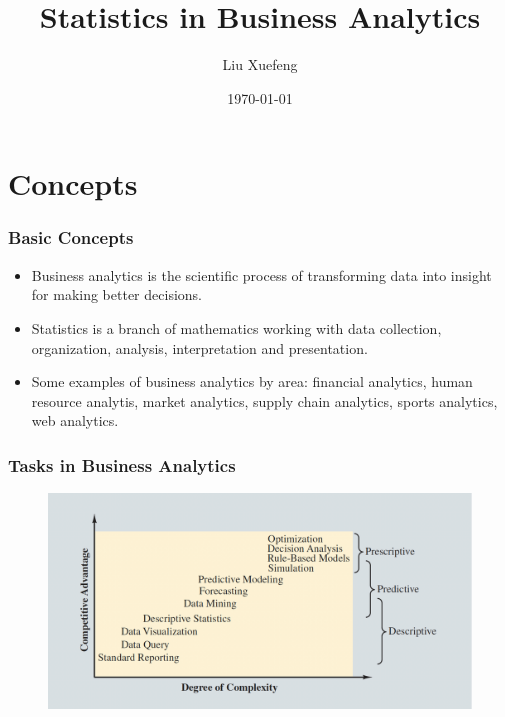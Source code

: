 \documentclass[11pt]{beamer}
\begin{document}
    \author{Liu Xuefeng}
    \title{Statistics in Business Analytics}
    \date{\today}
    \begin{frame}[plain]
    \maketitle
\end{frame}

\section{Concepts}
\begin{frame}
\frametitle{Basic Concepts}
    \begin{itemize}
        \item Business analytics is the scientific process of transforming data into insight for making better decisions.
        \item Statistics is a branch of mathematics working with data collection, organization, analysis, interpretation and presentation.
        \item Some examples of business analytics by area: financial analytics, human resource analytis, market analytics, supply chain analytics, sports analytics, web analytics.
    \end{itemize}
\end{frame}

\begin{frame}
\frametitle{Tasks in Business Analytics}
\begin{figure}
    \centering
    \includegraphics[width=0.9\linewidth]{pic/ba_spectrum}
    \label{fig:baspectrum}
\end{figure}

\end{frame}
\end{document}
